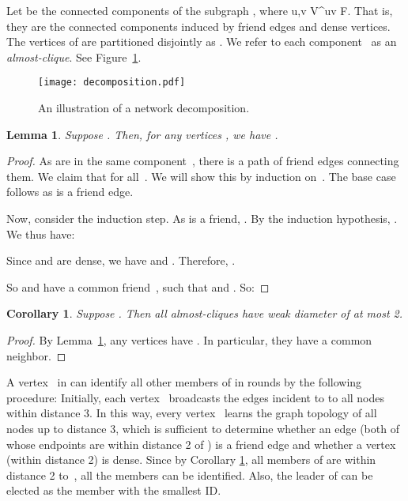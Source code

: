 \documentclass[11pt]{amsart}
\newtheorem{lemma}[theorem]{Lemma}
\newtheorem{corollary}[theorem]{Corollary}
\begin{document}
Let  be the connected components of the subgraph , where u,v \in V^{}uv \in F. That is, they are the connected components induced by friend edges and dense vertices. The vertices of  are partitioned disjointly as . We refer to each component~ as an \emph{almost-clique}. See Figure~\ref{fig:decomposition}.


\begin{figure}[t]
\centering
\texttt{[image: decomposition.pdf]}
\caption{An illustration of a network decomposition.}
\label{fig:decomposition}
\end{figure}


\begin{lemma}\label{lem:diameter}
Suppose . Then, for any vertices , we have .
\end{lemma}

\begin{proof}
As  are in the same component~, there is a path of friend edges  connecting them. We claim that  for all~. We will show this by induction on~. The base case~ follows as  is a friend edge.

Now, consider the induction step. As  is a friend, . By the induction hypothesis, . We thus have:


Since  and  are dense, we have  and . Therefore, .

So  and  have a common friend~, such that  and . So:

\end{proof}

\begin{corollary}\label{cor:diameter}
Suppose . Then all almost-cliques have weak diameter of at most 2.
\end{corollary}
\begin{proof}
By Lemma~\ref{lem:diameter}, any vertices  have . In particular, they have a common neighbor.
\end{proof}

A vertex~ in  can identify all other members of  in  rounds by  the following procedure: Initially, each vertex~ broadcasts the edges incident to  to all nodes within distance 3.  In this way, every vertex~ learns the graph topology of all nodes up to distance 3, which is sufficient to determine whether an edge (both of whose endpoints are within distance 2 of ) is a friend edge and whether a vertex (within distance 2) is dense. Since by Corollary \ref{cor:diameter}, all members of  are within distance 2 to~, all the members can be identified. Also, the leader of  can be elected as the member with the smallest ID.
\end{document}
